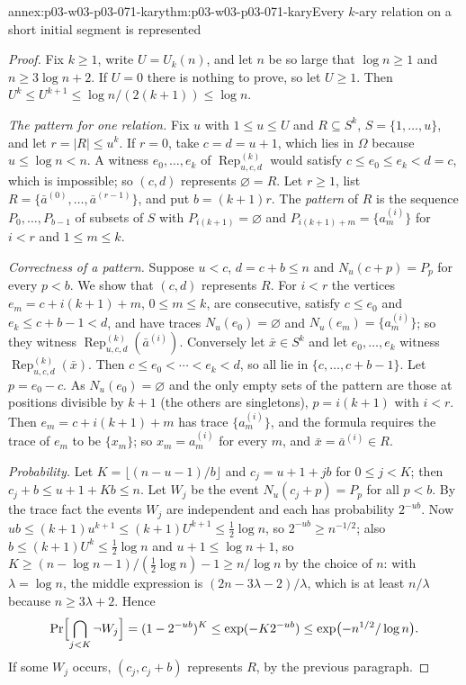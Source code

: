 \begin{annexitem}{annex:p03-w03-p03-071-kary}{thm:p03-w03-p03-071-kary}{Every \(k\)-ary relation on a short initial segment is represented}
\begin{proof}
Fix \(k\geq1\), write \(U=U_k(n)\), and let \(n\) be so large that
\(\log n\geq1\) and \(n\geq3\log n+2\).  If \(U=0\) there is nothing to
prove, so let \(U\geq1\).  Then \(U^k\leq U^{k+1}\leq\log n/(2(k+1))\leq\log
n\).

\emph{The pattern for one relation.}  Fix \(u\) with \(1\leq u\leq U\) and
\(R\subseteq S^k\), \(S=\{1,\ldots,u\}\), and let \(r=|R|\leq u^k\).  If
\(r=0\), take \(c=d=u+1\), which lies in \(\Omega\) because \(u\leq\log
n<n\).  A witness \(e_0,\ldots,e_k\) of
\(\operatorname{Rep}^{(k)}_{u,c,d}\) would satisfy \(c\leq e_0\leq e_k<d=c\),
which is impossible; so \((c,d)\) represents \(\varnothing=R\).  Let
\(r\geq1\), list \(R=\{\bar a^{(0)},\ldots,\bar a^{(r-1)}\}\), and put
\(b=(k+1)r\).  The \emph{pattern} of \(R\) is the sequence
\(P_0,\ldots,P_{b-1}\) of subsets of \(S\) with \(P_{i(k+1)}=\varnothing\) and
\(P_{i(k+1)+m}=\{a^{(i)}_m\}\) for \(i<r\) and \(1\leq m\leq k\).

\emph{Correctness of a pattern.}  Suppose \(u<c\), \(d=c+b\leq n\) and
\(N_u(c+p)=P_p\) for every \(p<b\).  We show that \((c,d)\) represents \(R\).
For \(i<r\) the vertices \(e_m=c+i(k+1)+m\), \(0\leq m\leq k\), are
consecutive, satisfy \(c\leq e_0\) and \(e_k\leq c+b-1<d\), and have traces
\(N_u(e_0)=\varnothing\) and \(N_u(e_m)=\{a^{(i)}_m\}\); so they witness
\(\operatorname{Rep}^{(k)}_{u,c,d}(\bar a^{(i)})\).  Conversely let
\(\bar x\in S^k\) and let \(e_0,\ldots,e_k\) witness
\(\operatorname{Rep}^{(k)}_{u,c,d}(\bar x)\).  Then
\(c\leq e_0<\cdots<e_k<d\), so all lie in \(\{c,\ldots,c+b-1\}\).  Let
\(p=e_0-c\).  As \(N_u(e_0)=\varnothing\) and the only empty sets of the
pattern are those at positions divisible by \(k+1\) (the others are
singletons), \(p=i(k+1)\) with \(i<r\).  Then \(e_m=c+i(k+1)+m\) has trace
\(\{a^{(i)}_m\}\), and the formula requires the trace of \(e_m\) to be
\(\{x_m\}\); so \(x_m=a^{(i)}_m\) for every \(m\), and \(\bar x=\bar
a^{(i)}\in R\).

\emph{Probability.}  Let \(K=\lfloor(n-u-1)/b\rfloor\) and \(c_j=u+1+jb\) for
\(0\leq j<K\); then \(c_j+b\leq u+1+Kb\leq n\).  Let \(W_j\) be the event
\(N_u(c_j+p)=P_p\) for all \(p<b\).  By the trace fact the events \(W_j\)
are independent and each has probability \(2^{-ub}\).  Now
\(ub\leq(k+1)u^{k+1}\leq(k+1)U^{k+1}\leq\frac12\log n\), so
\(2^{-ub}\geq n^{-1/2}\); also \(b\leq(k+1)U^k\leq\frac12\log n\) and
\(u+1\leq\log n+1\), so
\(K\geq(n-\log n-1)/(\tfrac12\log n)-1\geq n/\log n\) by the choice of
\(n\): with \(\lambda=\log n\), the middle expression is
\((2n-3\lambda-2)/\lambda\), which is at least \(n/\lambda\) because
\(n\geq3\lambda+2\).  Hence
\[
  \Pr\Bigl[\bigcap_{j<K}\neg W_j\Bigr]=(1-2^{-ub})^K\leq\exp(-K2^{-ub})
  \leq\exp\bigl(-n^{1/2}/\log n\bigr).
\]
If some \(W_j\) occurs, \((c_j,c_j+b)\) represents \(R\), by the previous
paragraph.


\end{proof}
\end{annexitem}
